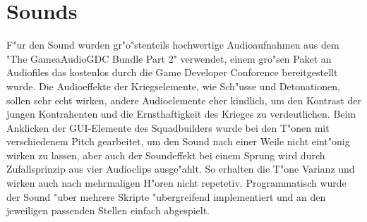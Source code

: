 \chapter{Sounds}

F"ur den Sound  wurden gr"o"stenteils hochwertige Audioaufnahmen aus dem "The GameaAudioGDC Bundle Part 2" verwendet, einem gro"sen Paket an Audiofiles das kostenlos durch die Game Developer Conforence bereitgestellt wurde.
Die Audioeffekte der Kriegselemente, wie Sch"usse und Detonationen, sollen sehr echt wirken, andere Audioelemente eher kindlich, um den Kontrast der jungen Kontrahenten und die Ernsthaftigkeit des Krieges zu verdeutlichen.
Beim Anklicken der GUI-Elemente des Squadbuilders wurde bei den T"onen mit verschiedenem Pitch gearbeitet, um den Sound nach einer Weile nicht eint"onig wirken zu lassen, aber auch der Soundeffekt bei einem Sprung wird durch Zufallsprinzip aus vier Audioclips ausge"ahlt. So erhalten die T"one Varianz und wirken auch nach mehrmaligen H"oren nicht repetetiv.
Programmatisch wurde der Sound "uber mehrere Skripte "ubergreifend implementiert und an den jeweiligen passenden Stellen einfach abgespielt.
